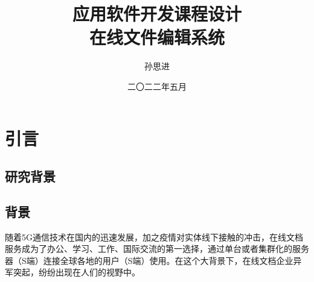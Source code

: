 \documentclass[forprint]{software}
\begin{document}

\miji{ }                                      %

\title{应用软件开发课程设计\\在线文件编辑系统}
\author{孙思进}                            %
\date{二〇二二年五月}                    %

\maketitle
\frontmatter
{}              %
\tableofcontents
\mainmatter %
\chapter{引言}

\section{研究背景}

\section{背景}

随着5G通信技术在国内的迅速发展，加之疫情对实体线下接触的冲击，在线文档服务成为了办公、学习、工作、国际交流的第一选择，通过单台或者集群化的服务器（S端）连接全球各地的用户（S端）使用。在这个大背景下，在线文档企业异军突起，纷纷出现在人们的视野中。
\end{document}
